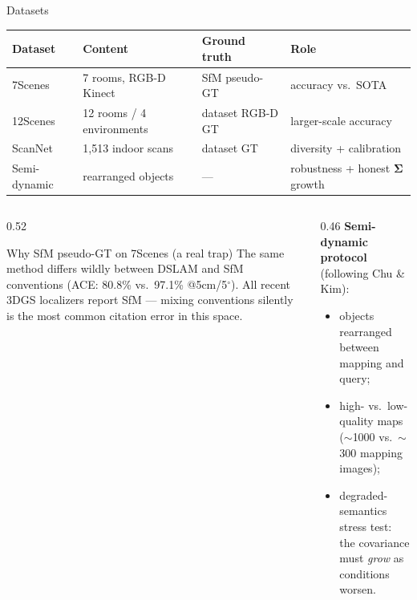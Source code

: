 \documentclass[aspectratio=169,10pt]{beamer}
\begin{document}
\begin{frame}{Datasets}
  \centering
  \small
  \begin{tabular}{llll}
    \toprule
    Dataset & Content & Ground truth & Role \\
    \midrule
    7Scenes  & 7 rooms, RGB-D Kinect & \alert{SfM pseudo-GT} & accuracy vs.\ SOTA\\
    12Scenes & 12 rooms / 4 environments & dataset RGB-D GT & larger-scale accuracy\\
    ScanNet  & 1{,}513 indoor scans & dataset GT & diversity + calibration\\
    Semi-dynamic & rearranged objects & --- & robustness + honest $\bm\Sigma$ growth\\
    \bottomrule
  \end{tabular}
  \vspace{3mm}
  \begin{columns}[T]
    \begin{column}{0.52\textwidth}
      \begin{block}{Why SfM pseudo-GT on 7Scenes (a real trap)}
        \small The same method differs wildly between DSLAM and SfM
        conventions (ACE: 80.8\% vs.\ 97.1\% @5cm/5$^\circ$). All recent
        3DGS localizers report SfM --- mixing conventions silently is the
        most common citation error in this space.
      \end{block}
    \end{column}
    \begin{column}{0.46\textwidth}
      \textbf{Semi-dynamic protocol} (following Chu \& Kim):
      \begin{itemize}\small
        \item objects rearranged between mapping and query;
        \item high- vs.\ low-quality maps ($\sim$1000 vs.\ $\sim$300
              mapping images);
        \item degraded-semantics stress test: the covariance must
              \emph{grow} as conditions worsen.
      \end{itemize}
    \end{column}
  \end{columns}
\end{frame}
\end{document}
